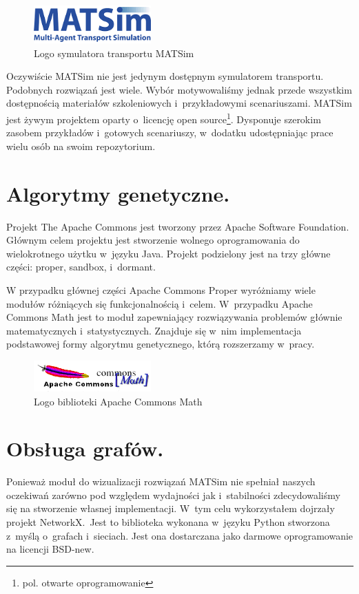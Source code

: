 \documentclass[twoside,12pt]{report}
\begin{document}
\begin{figure}[ht]
\centering
\includegraphics[width=0.40\textwidth]{img/matsim}
\caption{Logo symulatora transportu MATSim} 
\end{figure}

Oczywiście MATSim nie jest jedynym dostępnym symulatorem transportu. Podobnych rozwiązań jest wiele. Wybór motywowaliśmy jednak przede wszystkim dostępnością materiałów szkoleniowych i~przykładowymi scenariuszami. MATSim jest żywym projektem oparty o~licencję open source\footnote{pol. otwarte oprogramowanie}. Dysponuje szerokim zasobem przykładów i~gotowych scenariuszy, w~dodatku udostępniając prace wielu osób na swoim repozytorium.

\section{Algorytmy genetyczne.}

Projekt The Apache Commons jest tworzony przez Apache Software Foundation. Głównym celem projektu jest stworzenie wolnego oprogramowania do wielokrotnego użytku w~języku Java. Projekt podzielony jest na trzy główne części: proper, sandbox, i~dormant\cite{math}.

W przypadku głównej części Apache Commons Proper wyróżniamy wiele modułów różniących się funkcjonalnością i~celem. W~przypadku Apache Commons Math jest to moduł zapewniający rozwiązywania problemów głównie matematycznych i~statystycznych. Znajduje się w~nim implementacja podstawowej formy algorytmu genetycznego, którą rozszerzamy w~pracy.

\begin{figure}[ht]
\centering
\includegraphics[width=0.40\textwidth]{img/math}
\caption{Logo biblioteki Apache Commons Math} 
\end{figure}

\section{Obsługa grafów.}

Ponieważ moduł do wizualizacji rozwiązań MATSim nie spełniał naszych oczekiwań zarówno pod względem wydajności jak i~stabilności zdecydowaliśmy się na stworzenie własnej implementacji. W~tym celu wykorzystałem dojrzały projekt NetworkX.~Jest to biblioteka wykonana w~języku Python stworzona z~myślą o~grafach i~sieciach. Jest ona dostarczana jako darmowe oprogramowanie na licencji BSD-new\cite{networkx}. 
\end{document}

